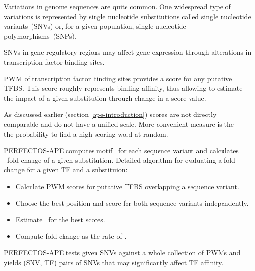 Variations in genome sequences are quite common. One widespread type of variations is represented by single nucleotide substitutions called single nucleotide variants~(SNVs) or, for a given population, single nucleotide polymorphisms~(SNPs).

SNVs in gene regulatory regions may affect gene expression through alterations in transcription factor binding sites.

PWM of transcription factor binding sites provides a score for any putative TFBS.
This score roughly represents binding affinity, thus allowing to estimate 
the impact of a given substitution through change in a score value.

As discussed earlier (section \ref{ape-introduction}) scores are not directly comparable and do not have a unified scale. More convenient measure is the \pvalue\ - the probability to find a high-scoring word at random.

PERFECTOS-APE computes motif \pvalues\ for each sequence variant and calculates \pvalue\ fold change of a given substitution. Detailed algorithm for evaluating a fold change for a given TF and a substituion:

\begin{itemize}
\item Calculate PWM scores for putative TFBS overlapping a sequence variant.
\item Choose the best position and score for both sequence variants independently.
\item Estimate \pvalues\ for the best scores.
\item Compute fold change as the rate of \pvalues.
\end{itemize}

PERFECTOS-APE tests given SNVs against a whole collection of PWMs and yields (SNV, TF) pairs of SNVs that may significantly affect TF affinity.

